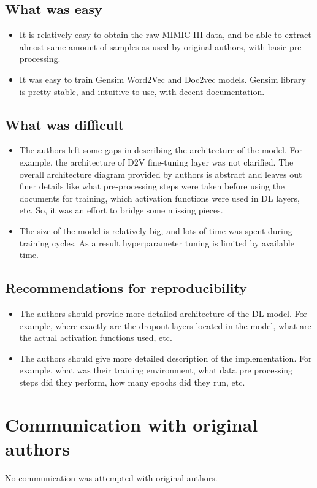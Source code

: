 \documentclass[11pt,a4paper]{article}
\begin{document}
\subsection{What was easy}
\begin{itemize}
	\item It is relatively easy to obtain the raw MIMIC-III data, and be able to extract almost same amount of samples as used by original authors, with basic pre-processing. 
	\item It was easy to train Gensim Word2Vec and Doc2vec models. Gensim library is pretty stable, and intuitive to use, with decent documentation.
\end{itemize}

\subsection{What was difficult}
\begin{itemize}
	\item The authors left some gaps in describing the architecture of the model. For example, the architecture of D2V fine-tuning layer was not clarified. The overall architecture diagram provided by authors is abstract and leaves out finer details like what pre-processing steps were taken before using the documents for training, which activation functions were used in DL layers, etc. So, it was an effort to bridge some missing pieces.
	\item The size of the model is relatively big, and lots of time was spent during training cycles. As a result hyperparameter tuning is limited by available time.
\end{itemize}

\subsection{Recommendations for reproducibility}
\begin{itemize}
	\item The authors should provide more detailed architecture of the DL model. For example, where exactly are the dropout layers located in the model, what are the actual activation functions used, etc.
	\item The authors should give more detailed description of the implementation. For example, what was their training environment, what data pre processing steps did they perform, how many epochs did they run, etc.
\end{itemize}


\section{Communication with original authors}

No communication was attempted with original authors.





\end{document}

